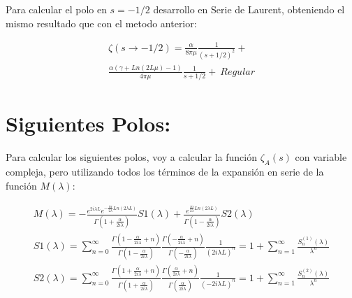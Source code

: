 Para calcular el polo en $s=-1/2$ desarrollo en Serie de Laurent, obteniendo el mismo resultado que con el metodo anterior:

\begin{equation}
\begin{array}{c}

	\zeta (s \rightarrow -1/2) = 
    \frac{\alpha}{8 \pi \mu } \frac{1}{(s+1/2)^2} + \\
	\frac{\alpha ( \gamma  + Ln(2L \mu ) -1 )}{4 \pi \mu } \frac{1}{s+1/2} + \ Regular
    
\end{array}
\label{eq.desarrollo}
\end{equation}



\section{Siguientes Polos:} 

Para calcular los siguientes polos, voy a calcular la función $\zeta _A (s) $ con variable compleja, pero utilizando todos los términos de la expansión en serie de la función $M ( \lambda )$:

\begin{equation}
\begin{array}{c}
M( \lambda ) = 
-
 \frac{e ^{2 i \lambda L } e ^{ - \frac{i \alpha  }{2 \lambda } Ln \left( 2 \lambda L \right) }  }
      { \Gamma \left( 1 + \frac{ \alpha}{2 i \lambda}  \right) } S1 ( \lambda ) +
 \frac{ e ^{   \frac{i \alpha  } {2 \lambda } Ln \left(2 \lambda L \right) } }
      { \Gamma \left( 1 - \frac{ \alpha}{2 i \lambda}  \right)   } S2 ( \lambda )  \\ [15pt]
      
S1 ( \lambda ) = \sum _{n=0} ^{ \infty }
\frac{\Gamma (1 - \frac{ \alpha}{2 i \lambda} + n )}{\Gamma (1 - \frac{ \alpha}{2 i \lambda})} 
\frac{\Gamma (- \frac{ \alpha}{2 i \lambda} + n )}{\Gamma (- \frac{\alpha}{2 i \lambda})} 
\frac{1}{( 2 i \lambda L ) ^n} = 
1 + \sum _{n=1} ^{\infty} \frac{S ^{(1)} _n (\lambda)}{\lambda ^n} \\ [10pt]

S2 (\lambda ) = \sum _{n=0 } ^{\infty}
\frac{ \Gamma ( 1 + \frac{ \alpha}{2 i \lambda } + n ) }{\Gamma ( 1 + \frac{ \alpha}{2 i \lambda } )}
\frac{\Gamma ( \frac{ \alpha }{2 i \lambda} + n )}{\Gamma ( \frac{ \alpha }{2 i \lambda} )}
\frac{1}{( - 2 i \lambda L ) ^n} = 
1 + \sum _{n=1} ^{\infty} \frac{S ^{(2)} _n (\lambda)}{\lambda ^n}
\end{array}
\label{larga}
\end{equation}


